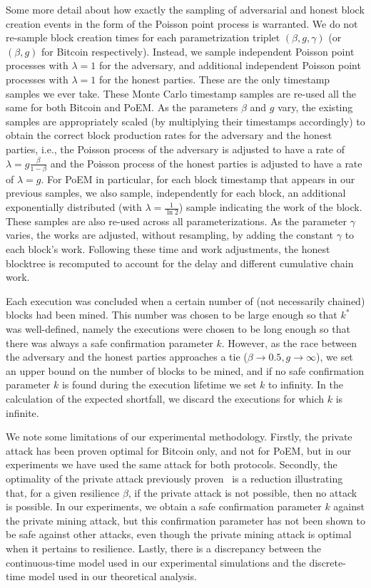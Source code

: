 Some more detail about how exactly the sampling of adversarial and honest block creation events in the form of the
Poisson point process is warranted. We do not re-sample block creation times for each parametrization triplet
$(\beta, g, \gamma)$ (or $(\beta, g)$ for Bitcoin respectively). Instead, we sample \montecarlo{} independent
Poisson point processes with $\lambda = 1$ for the adversary, and \montecarlo{} additional independent Poisson point processes
with $\lambda = 1$ for the honest parties. These are the only timestamp samples we ever take. These Monte Carlo timestamp
samples are re-used all the same for both Bitcoin and PoEM. As the parameters $\beta$ and $g$ vary, the existing
samples are appropriately scaled (by multiplying their timestamps accordingly) to obtain the correct block
production rates for the adversary and the honest parties,
i.e., the Poisson process of the adversary is adjusted to have a rate of $\lambda = g\frac{\beta}{1 - \beta}$ and the
Poisson process of the honest parties is adjusted to have a rate of $\lambda = g$.
For PoEM in particular, for each block timestamp that appears in our previous samples, we also sample, independently for each block, an additional exponentially distributed (with $\lambda = \frac{1}{\ln2}$) sample indicating the work of the block.
These samples are also re-used across all parameterizations. As the parameter $\gamma$
varies, the works are adjusted, without resampling, by adding the constant $\gamma$ to each block's work.
Following these time and work adjustments, the honest blocktree is recomputed to account for the delay and
different cumulative chain work.

Each execution was concluded when a certain number of (not necessarily chained) blocks had been mined.
This number was chosen to be large enough so that $k^*$ was well-defined, namely the executions were
chosen to be long enough so that there was always a safe confirmation parameter $k$. However, as the
race between the adversary and the honest parties approaches a tie ($\beta \rightarrow 0.5, g \rightarrow \infty$),
we set an upper bound on the number of blocks to be mined, and if no safe confirmation parameter $k$ is found during the
execution lifetime we set $k$ to infinity. In the calculation of the expected shortfall, we discard the executions for which
$k$ is infinite.

We note some limitations of our experimental methodology. Firstly, the private attack has been proven optimal
for Bitcoin only, and not for PoEM, but in our experiments we have used the same attack for both protocols.
Secondly, the optimality of the private attack previously proven~\cite{eiar} is a reduction illustrating
that, for a given resilience $\beta$, if the private attack is not possible, then no attack is possible.
In our experiments, we obtain a safe confirmation parameter $k$ against the private mining attack,
but this confirmation parameter has not been shown to be safe against other attacks, even though the private
mining attack is optimal when it pertains to resilience.
Lastly, there is a discrepancy between the continuous-time model used in our experimental simulations
and the discrete-time model used in our theoretical analysis.

